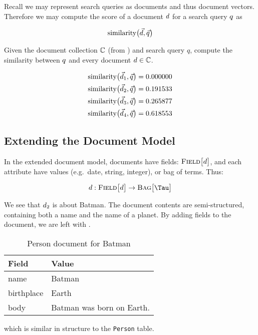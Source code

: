 		Recall we may represent search queries as documents and thus document vectors.  Therefore we may compute the score of a document $d$ for a search query $q$ as
		
		\[
		    \operatorname{similarity}\bigl(\vec{d}, \vec{q}\bigr)
		\]
		
		\begin{ex}
			Given the document collection $\mathbb{C}$ (from ) and search query $q$, compute the similarity between $q$ and every document $d \in \mathbb{C}$.
			
			\begin{align}
				\operatorname{similarity}\bigl(\vec{d}_1, \vec{q}\bigr) &= 0.000000 \\
				\operatorname{similarity}\bigl(\vec{d}_2, \vec{q}\bigr) &= 0.191533 \\
				\operatorname{similarity}\bigl(\vec{d}_3, \vec{q}\bigr) &= 0.265877 \\
				\operatorname{similarity}\bigl(\vec{d}_4, \vec{q}\bigr) &= 0.618553
			\end{align}
		\end{ex}
		
	\subsection{Extending the Document Model}
	\label{sec:extending-the-document-model}
		In the extended document model, documents have fields: $\textsc{Field}\bigl[d\bigr]$, and each attribute have values (e.g.~date, string, integer), or bag of terms.  Thus:

		\[
    		\doc : \fields{\doc} \to \bag{\terms}
		\]
		
		\begin{ex}
			We see that $d_2$ is about Batman.  The document contents are semi-structured, containing both a name and the name of a planet.  By adding fields to the document, we are left with \Vref{tbl:person-document}.
			
			\begin{table}[!ht]
				\centering
				
				\begin{tabular}{ll}
					\toprule
					Field & Value \\
					\midrule
					name & Batman \\
					birthplace & Earth \\
					body & Batman was born on Earth. \\
					\bottomrule
				\end{tabular}
				
				\caption{Person document for Batman}
				\label{tbl:person-document}
			\end{table}
			
			which is similar in structure to the \texttt{Person} table.
		\end{ex}
		
